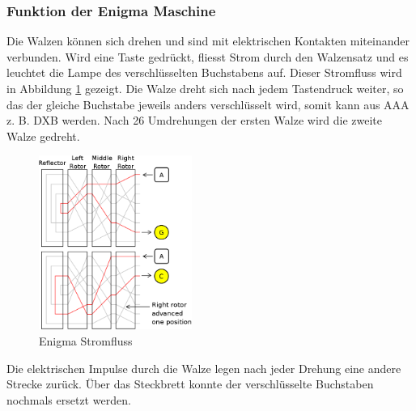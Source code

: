 \subsubsection{Funktion der Enigma Maschine}
Die Walzen können sich drehen und sind mit elektrischen Kontakten miteinander verbunden. Wird eine Taste gedrückt, fliesst Strom durch den Walzensatz und es leuchtet die Lampe des verschlüsselten Buchstabens auf. Dieser Stromfluss wird in Abbildung \ref{fig:stromfluss} gezeigt. Die Walze dreht sich nach jedem Tastendruck weiter, so das der gleiche Buchstabe jeweils anders verschlüsselt wird, somit kann aus AAA z. B. DXB werden. Nach 26 Umdrehungen der ersten Walze wird die zweite Walze gedreht. \\
%
\begin{figure}[ht]
\begin{center}
\includegraphics[width=5cm]{images/Enigma-action.png}
\caption[Enigma Stromfluss Quelle:\newline ~~~~http://upload.wikimedia.org/wikipedia/commons/6/6c/Enigma\-action.svg]{Enigma Stromfluss}
\label{fig:stromfluss}
\end{center}
\end{figure}
%
Die elektrischen Impulse durch die Walze legen nach jeder Drehung eine andere Strecke zurück. 
Über das Steckbrett konnte der verschlüsselte Buchstaben nochmals ersetzt werden. %
%
